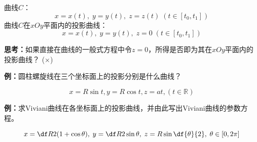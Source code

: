 曲线$C$：
$$x=x(t),\;y=y(t),\;z=z(t)\;(t\in[t_0,t_1])$$ 
曲线$C$在$xOy$平面内的投影曲线：
$$x=x(t),\;y=y(t),\;{z=0}\;(t\in[t_0,t_1])$$ 

{\bf 思考：}如果直接在曲线的一般式方程中令$z=0$，所得是否即为其在$xOy$平面内的投影曲线？
(${\times}$)

{\bf 例：}圆柱螺旋线在三个坐标面上的投影分别是什么曲线？
\begin{center}
\end{center}
$$x=R\sin t, y=R\cos t, z=at,(t\in\mathbb{R})$$

{\bf 例：}求Viviani曲线在各坐标面上的投影曲线，并由此写出Viviani曲线的参数方程。
\begin{center}
\end{center}
$${x=\df R2(1+\cos\theta),\;y=\df
R2\sin\theta,\;z=R\sin\df{\theta}{2},\;\theta\in[0,2\pi]}$$

